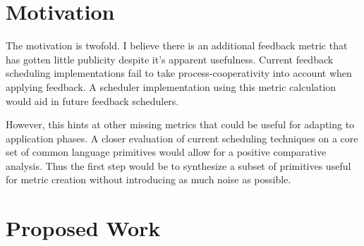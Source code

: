 \section{Motivation}

The motivation is twofold. I believe there is an additional feedback metric that has gotten little publicity 
despite it's apparent usefulness. Current feedback scheduling implementations fail to take process-cooperativity
into account when applying feedback. A scheduler implementation using this metric calculation would aid in future
feedback schedulers.

However, this hints at other missing metrics that could be useful for adapting to
application phases. A closer evaluation of current scheduling techniques on a core set of common language 
primitives would allow for a positive comparative analysis. Thus the first step would be to synthesize a subset
of primitives useful for metric creation without introducing as much noise as possible.


\section{Proposed Work} %



